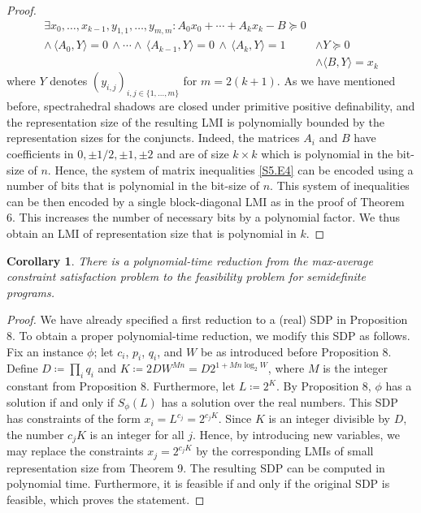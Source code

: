\documentclass[10pt,a4paper]{article}
\newtheorem{corollary}[theorem]{Corollary}
\theoremstyle{definition}
\begin{document}
\begin{proof}
\begin{equation}\tag{4}\label{S5.E4}
\begin{aligned}
\displaystyle\exists x_{0},\dots,x_{k-1},y_{1,1},\dots,y_{m,m}:A_{0}x_{0}+\cdots+A_{k}x_{k}-B\succeq 0 &  \\
\displaystyle\wedge\,\langle A_{0},Y\rangle=0\,\wedge\cdots\wedge\,\langle A_{k-1},Y\rangle=0\,\wedge\,\langle A_{k},Y\rangle=1 & \displaystyle\wedge Y\succeq 0 \\
 & \displaystyle\wedge\langle B,Y\rangle=x_{k}
\end{aligned}
\end{equation}
where $Y$ denotes $(y_{i,j})_{i,j\in\{1,\dots,m\}}$ for $m=2(k+1)$. As we have mentioned before, spectrahedral shadows are closed under primitive positive definability, and the representation size of the resulting LMI is polynomially bounded by the representation sizes for the conjuncts. Indeed, the matrices $A_{i}$ and $B$ have coefficients in ${0,\pm 1/2,\pm 1,\pm 2}$ and are of size $k\times k$ which is polynomial in the bit-size of $n$. Hence, the system of matrix inequalities \eqref{S5.E4} can be encoded using a number of bits that is polynomial in the bit-size of $n$. This system of inequalities can be then encoded by a single block-diagonal LMI as in the proof of Theorem 6. This increases the number of necessary bits by a polynomial factor. We thus obtain an LMI of representation size that is polynomial in $k$. 

\end{proof}

\setcounter{theorem}{9}
\begin{corollary}\label{Thmtheorem10}
There is a polynomial-time reduction from the max-average constraint satisfaction problem to the feasibility problem for semidefinite programs.

\end{corollary}

\begin{proof}
We have already specified a first reduction to a (real) SDP in Proposition 8. To obtain a proper polynomial-time reduction, we modify this SDP as follows. Fix an instance $\phi$; let $c_{i}$, $p_{i}$, $q_{i}$, and $W$ be as introduced before Proposition 8. Define $D\coloneqq\prod_{i}q_{i}$ and $K\coloneqq 2DW^{Mn}=D2^{1+Mn\log_{2}W}$, where $M$ is the integer constant from Proposition 8. Furthermore, let $L\coloneqq 2^{K}$. By Proposition 8, $\phi$ has a solution if and only if $S_{\phi}(L)$ has a solution over the real numbers. This SDP has constraints of the form $x_{i}=L^{c_{j}}=2^{c_{j}K}$. Since $K$ is an integer divisible by $D$, the number $c_{j}K$ is an integer for all $j$. Hence, by introducing new variables, we may replace the constraints $x_{j}=2^{c_{j}K}$ by the corresponding LMIs of small representation size from Theorem 9. The resulting SDP can be computed in polynomial time. Furthermore, it is feasible if and only if the original SDP is feasible, which proves the statement. 

\end{proof}
\end{document}
